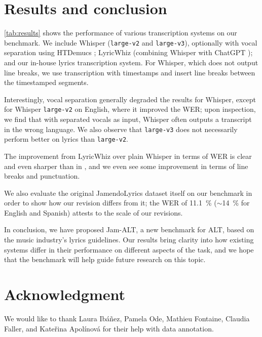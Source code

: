 \documentclass{article}
\begin{document}
\section{Results and conclusion}
\cref{tab:results} shows the performance of various transcription systems on our benchmark.
We include Whisper \cite{pmlr-v202-radford23a} (\texttt{large-v2} and \texttt{large-v3}), optionally with vocal separation using HTDemucs \cite{rouard-2023-htdemucs}; LyricWhiz \cite{zhuo-2023-lyricwhiz} (combining Whisper with ChatGPT \cite{chatgpt}); and our in-house lyrics transcription system.
For Whisper, which does not output line breaks, we use transcription with timestamps and insert line breaks between the timestamped segments.

Interestingly, vocal separation generally degraded the results for Whisper, except for Whisper \texttt{large-v2} on English, where it improved the WER; upon inspection, we find that with separated vocals as input, Whisper often outputs a transcript in the wrong language.
We also observe that \texttt{large-v3} does not necessarily perform better on lyrics than \texttt{large-v2}.

The improvement from LyricWhiz over plain Whisper in terms of WER is clear and even sharper than in \cite{zhuo-2023-lyricwhiz}, and we even see some improvement in terms of line breaks and punctuation.

We also evaluate the original JamendoLyrics dataset itself on our benchmark in order to show how our revision differs from it; the WER of \SI{11.1}{\percent} ($\sim$\SI{14}{\percent} for English and Spanish) attests to the scale of our revisions.

In conclusion, we have proposed Jam-ALT, a new benchmark for ALT, based on the music industry's lyrics guidelines.
Our results bring clarity into how existing systems differ in their performance on different aspects of the task, and we hope that the benchmark will help guide future research on this topic.

\section{Acknowledgment}
We would like to thank Lau\-ra I\-bá\-ñez, Pa\-me\-la Ode, Ma\-thieu Fon\-taine, Clau\-dia Fal\-ler, and Ka\-te\-ři\-na Apo\-lí\-no\-vá for their help with data annotation.



\onecolumn
\appendix
\end{document}
